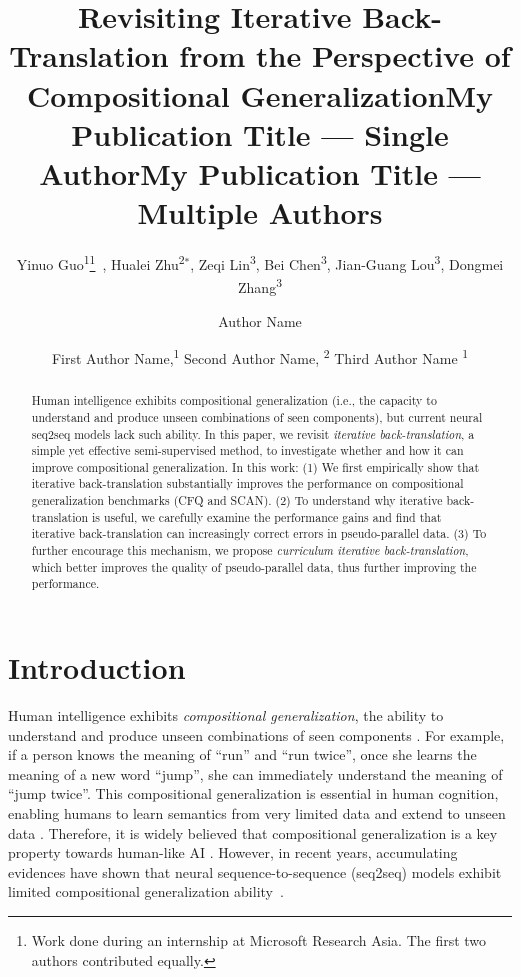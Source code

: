 \documentclass[letterpaper]{article} %
\title{Revisiting Iterative Back-Translation from the Perspective of Compositional Generalization}
\author{Yinuo Guo\textsuperscript{\rm 1}{\thanks{Work done during an internship at Microsoft Research Asia. The first two authors contributed equally.}}~, Hualei Zhu\textsuperscript{\rm 2}$^*$, Zeqi Lin\textsuperscript{\rm 3},  Bei Chen\textsuperscript{\rm 3}, Jian-Guang Lou\textsuperscript{\rm 3}, Dongmei Zhang\textsuperscript{\rm 3}\\}
\title{My Publication Title --- Single Author}
\author {
    Author Name \\
}
\title{My Publication Title --- Multiple Authors}
\author {
    First Author Name,\textsuperscript{\rm 1}
    Second Author Name, \textsuperscript{\rm 2}
    Third Author Name \textsuperscript{\rm 1} \\
}
\begin{document}
\maketitle

\begin{abstract}
Human intelligence exhibits compositional generalization (i.e., the capacity to
understand and produce unseen combinations of seen components), but current neural seq2seq models lack such ability.
In this paper, we revisit \emph{iterative back-translation}, a simple yet effective semi-supervised method, to investigate whether and how it can improve compositional generalization.
In this work:
(1) We first empirically show that iterative back-translation substantially improves the performance on compositional generalization benchmarks (CFQ and SCAN).
(2) To understand why iterative back-translation is useful, we carefully examine the performance gains and find that iterative back-translation can increasingly correct errors in pseudo-parallel data.
(3) To further encourage this mechanism, we propose \emph{curriculum iterative back-translation}, which better improves the quality of pseudo-parallel data, thus further improving the performance.
\end{abstract}

\section{Introduction}
Human intelligence exhibits \emph{compositional generalization}, the ability to understand and produce unseen combinations of seen components \cite{chomsky1965aspects,fodor1988connectionism}.
For example, if a person knows the meaning of ``run'' and ``run twice'', once she learns the meaning of a new word ``jump'', she can immediately understand the meaning of ``jump twice''.
This compositional generalization is essential in human cognition, enabling humans to learn semantics from very limited data and extend to unseen data \cite{montague1974formal,partee1984compositionality,lake2017building}.
Therefore, it is widely believed that compositional generalization is a key property towards human-like AI \cite{mikolov2016roadmap,bengio2019towards,mollica2020composition}.
However, in recent years, accumulating evidences have shown that neural sequence-to-sequence (seq2seq) models exhibit limited compositional generalization ability~\cite{lake2018generalization,hupkes2020compositionality,keysers2020measuring,furrer2020compositional}.

\end{document}
